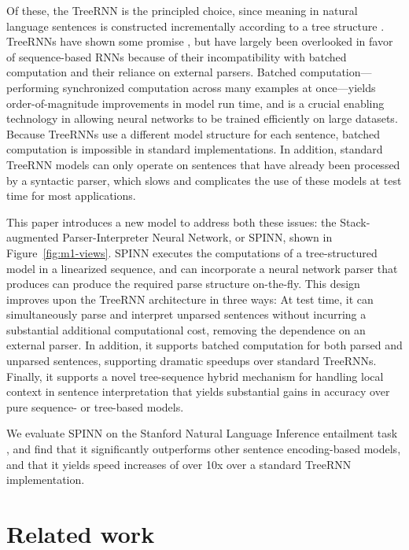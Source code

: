 \documentclass[11pt]{article}
\begin{document}
Of these, the TreeRNN is the principled choice, since meaning in natural language sentences is constructed incrementally according to a tree structure \citep[][i.a.]{Szabolcsi:2009}. TreeRNNs have shown some promise \citep{tai2015improved,li2015tree,bowman2015trees}, but have largely been overlooked in favor of sequence-based RNNs because of their incompatibility with batched computation and their reliance on external parsers.  Batched computation---performing synchronized computation across many examples at once---yields order-of-magnitude improvements in model run time, and is a crucial enabling technology in allowing neural networks to be trained efficiently on large datasets. Because TreeRNNs use a different model structure for each sentence, batched computation is impossible in standard implementations. In addition, standard TreeRNN models can only operate on sentences that have already been processed by a syntactic parser, which slows and complicates the use of these models at test time for most applications.

This paper introduces a new model to address both these issues: the Stack-augmented Parser-Interpreter Neural Network, or SPINN, shown in Figure~\ref{fig:m1-views}. SPINN executes the computations of a tree-structured model in a linearized sequence, and can incorporate a neural network parser that produces can produce the required parse structure on-the-fly. This design improves upon the TreeRNN architecture in three ways: At test time, it can simultaneously parse and interpret unparsed sentences without incurring a substantial additional computational cost, removing the dependence on an external parser. In addition, it supports batched computation for both parsed and unparsed sentences, supporting dramatic speedups over standard TreeRNNs. Finally, it supports a novel tree-sequence hybrid mechanism for handling local context in sentence interpretation that yields substantial gains in accuracy over pure sequence- or tree-based models.

We evaluate SPINN on the Stanford Natural Language Inference entailment task \citep[SNLI,][]{snli:emnlp2015}, and find that it significantly outperforms other sentence encoding-based models, and that it yields speed increases of over 10x over a standard TreeRNN implementation.

\section{Related work}
\end{document}
